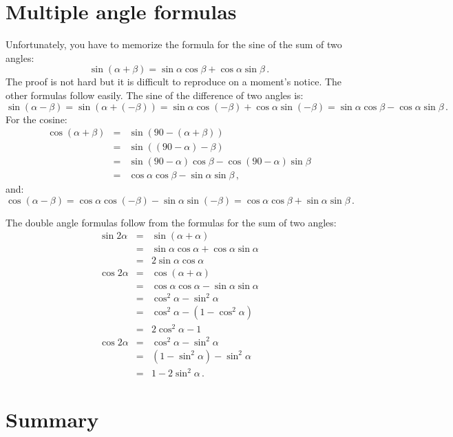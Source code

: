 \documentclass[11pt,a4paper]{article}
\begin{document}

\section{Multiple angle formulas}

Unfortunately, you have to memorize the formula for the sine of the sum of two angles:
\[
\sin(\alpha+\beta)=\sin\alpha\cos\beta+\cos\alpha\sin\beta\,.
\]
The proof is not hard but it is difficult to reproduce on a moment's notice. The other formulas follow easily. The sine of the difference of two angles is:
\[
\sin(\alpha-\beta)=\sin(\alpha+(-\beta))=\sin\alpha\cos(-\beta)+\cos\alpha\sin(-\beta) = 
\sin\alpha\cos\beta-\cos\alpha\sin\beta\,.
\]
For the cosine:
\begin{eqnarray*}
\cos(\alpha+\beta)&=&\sin(90-(\alpha+\beta))\\
&=& \sin((90-\alpha)-\beta)\\
&=& \sin(90-\alpha)\cos\beta-\cos(90-\alpha)\sin\beta\\
&=&\cos\alpha\cos\beta - \sin\alpha\sin\beta\,,
\end{eqnarray*}
and:
\[
\cos(\alpha-\beta) = \cos\alpha\cos(-\beta) - \sin\alpha\sin(-\beta) = 
\cos\alpha\cos\beta + \sin\alpha\sin\beta\,.
\]

The double angle formulas follow from the formulas for the sum of two angles:
\begin{eqnarray*}
\sin 2\alpha &=& \sin(\alpha+\alpha)\\
&=& \sin\alpha\cos\alpha+\cos\alpha\sin\alpha\\
&=& 2\sin\alpha\cos\alpha\\
\cos 2\alpha &=& \cos(\alpha+\alpha)\\
&=& \cos\alpha\cos\alpha - \sin\alpha\sin\alpha\\
&=& \cos^2\alpha-\sin^2\alpha\\
&=& \cos^2\alpha- (1-\cos^2\alpha)\\
&=& 2\cos^2\alpha-1\\
\cos 2\alpha &=& \cos^2\alpha-\sin^2\alpha\\
&=& (1-\sin^2\alpha) -\sin^2\alpha\\
&=&  1-2\sin^2\alpha\,.
\end{eqnarray*}


\section{Summary}
\end{document}
